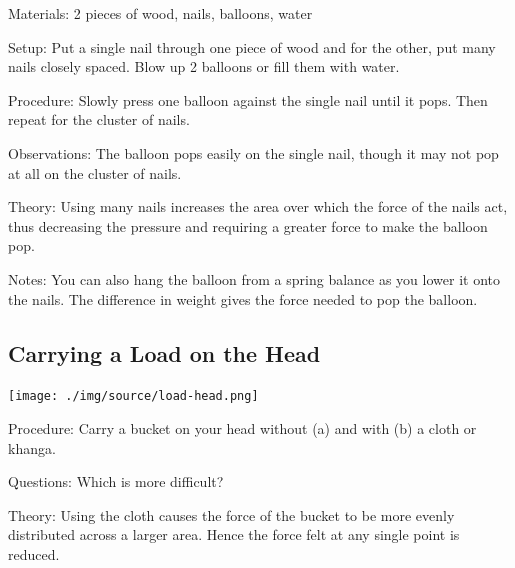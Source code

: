\begin{multicols}{2}

\begin{description*}
\item[Materials:]{2 pieces of wood, nails, balloons, water}
\item[Setup:]{Put a single nail through one piece of wood and for the other, put many nails closely spaced. Blow up 2 balloons or fill them with water.}
\item[Procedure:]{Slowly press one balloon against the single nail until it pops. Then repeat for the cluster of nails.}
\item[Observations:]{The balloon pops easily on the single nail, though it may not pop at all on the cluster of nails.}
\item[Theory:]{Using many nails increases the area over which the force of the nails act, thus decreasing the pressure and requiring a greater force to make the balloon pop.}
\item[Notes:]{You can also hang the balloon from a spring balance as you lower it onto the nails. The difference in weight gives the force needed to pop the balloon.}
\end{description*}

\columnbreak

\subsection{Carrying a Load on the Head}

\begin{center}
\texttt{[image: ./img/source/load-head.png]}
\end{center}

\begin{description*}
\item[Procedure:]{Carry a bucket on your head without (a) and with (b) a cloth or khanga.}
\item[Questions:]{Which is more difficult?}
\item[Theory:]{Using the cloth causes the force of the bucket to be more evenly distributed across a larger area. Hence the force felt at any single point is reduced.}
\end{description*}


\end{multicols}
